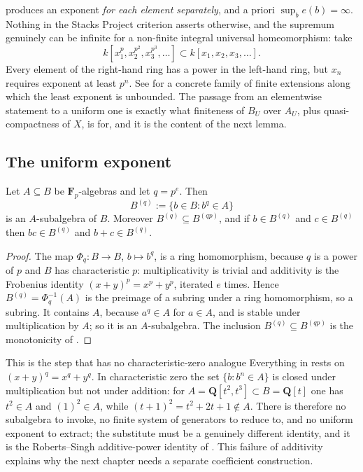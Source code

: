 \begin{remark}
\label{rem:ch43-elementwise-not-enough}
 produces an exponent \emph{for each
element separately}, and a priori $\sup_be(b)=\infty$.  Nothing in the
Stacks Project criterion asserts otherwise, and the supremum genuinely can
be infinite for a non-finite integral universal homeomorphism: take
\[
 k[x_1^p,x_2^{p^2},x_3^{p^3},\ldots]
 \subset k[x_1,x_2,x_3,\ldots].
\]
Every element of the right-hand ring has a power in the left-hand ring, but
$x_n$ requires exponent at least $p^n$.  See
 for a concrete family of finite
extensions along which the least exponent is unbounded.
The passage from an elementwise statement to a uniform one is exactly what
finiteness of $B_U$ over $A_U$, plus quasi-compactness of $X$, is for,
and it is the content of the next lemma.
\end{remark}

\subsection{The uniform exponent}
\label{sec:ch43-frobenius-uniform}

\begin{lemma}
\label{lem:ch43-frobenius-subalgebra}
Let $A\subseteq B$ be $\mathbf F_p$-algebras and let $q=p^e$.  Then
\[
 B^{(q)}:=\{b\in B:b^q\in A\}
\]
is an $A$-subalgebra of $B$.  Moreover
$B^{(q)}\subseteq B^{(qp)}$, and if $b\in B^{(q)}$ and $c\in B^{(q)}$
then $bc\in B^{(q)}$ and $b+c\in B^{(q)}$.
\end{lemma}

\begin{proof}
The map $\Phi_q:B\to B$, $b\mapsto b^q$, is a ring homomorphism, because
$q$ is a power of $p$ and $B$ has characteristic $p$: multiplicativity
is trivial and additivity is the Frobenius identity
$(x+y)^{p}=x^p+y^p$, iterated $e$ times.  Hence
$B^{(q)}=\Phi_q^{-1}(A)$ is the preimage of a subring under a ring
homomorphism, so a subring.  It contains $A$, because $a^q\in A$ for
$a\in A$, and is stable under multiplication by $A$; so it is an
$A$-subalgebra.  The inclusion $B^{(q)}\subseteq B^{(qp)}$ is the
monotonicity of .
\end{proof}

\begin{warning}{This is the step that has no characteristic-zero analogue}
\label{warn:ch43-subalgebra-charp}
Everything in  rests on
$(x+y)^q=x^q+y^q$.  In characteristic zero the set
$\{b:b^n\in A\}$ is closed under multiplication but not under addition:
for $A=\mathbf Q[t^2,t^3]\subset B=\mathbf Q[t]$ one has $t^2\in A$ and
$(1)^2\in A$, while $(t+1)^2=t^2+2t+1\notin A$.  There is therefore no
subalgebra to invoke, no finite system of generators to reduce to, and no
uniform exponent to extract; the substitute must be a genuinely different
identity, and it is the Roberts--Singh additive-power identity of
.  This failure of additivity explains why the next chapter needs a
separate coefficient construction.
\end{warning}

